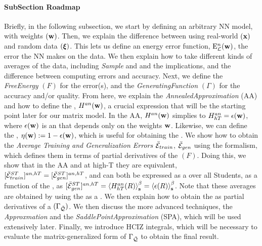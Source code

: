 \paragraph{SubSection Roadmap}
Briefly, in the following subsection,
we start by defining an arbitrary NN model, with weights $({\mathbf{w}})$.
Then, we explain the difference between using real-world $({\mathbf{x}})$ and random data $(\boldsymbol{\xi})$.
This lets us define an energy error function, ${\mathrm{E}}^{n}_{\mathcal{L}}(\mathbf{w})$,
the error the NN makes on the data.
We then explain how to take different kinds of \emph{\Thermodynamic} averages of the data,
including \emph{Sample} and \emph{\ThermalAverages} and the implications,
and the difference between computing errors and accuracy.
Next, we define the \emph{FreeEnergy} $(F)$ for the error(s), and the \emph{GeneratingFunction}  $(\Gamma)$
for the accuracy and/or quality.
From here, we explain the \emph{AnnealedApproximation} (AA) and
how to define the  \emph{\AnnealedHamiltonian}, $H^{an}({\mathbf{w}})$, a crucial expression
that will be the starting point later for our matrix model.
In the AA, $H^{an}({\mathbf{w}})$ simplies to  $H^{an}_{hT}=\epsilon({\mathbf{w}})$, where $\epsilon({\mathbf{w}})$ is an \EffectivePotential
that depends only on the weights ${\mathbf{w}}$.
Likewise, we can define the \SelfOverlap, $\eta({\mathbf{w}}):=1-\epsilon({\mathbf{w}})$, which is useful for
obtaining the \Quality.
We show how to obtain the \emph{Average Training and Generalization Errors} $\bar{\mathcal{E}}_{train}$, $\bar{\mathcal{E}}_{gen}$
using the \STATMECH formalism, which defines them in terms of partial derivatives of the \FreeEnergy $(F)$.
Doing this, we show that in the AA and at high-T they are equivalent,
$[\bar{\mathcal{E}}^{ST}_{train}]^{an,hT}=[\bar{\mathcal{E}}^{ST}_{gen}]^{an,hT}$,
and can both be expressed as a \ThermalAverage over all Students, as a function 
of the \Teacher, as $[\bar{\mathcal{E}}^{ST}_{gen}]^{an,hT}=\left\langle H^{an}_{hT}(R) \right\rangle_{\mathbf s}^{\beta}=\left\langle \epsilon(R) \right\rangle_{\mathbf s}^{\beta}$.
Note that these averages are obtained by using the \FreeEnergy as a \GeneratingFunction.
We then explain how to obtain the \ModelQuality as partial derivatives of a
\emph{\GeneratingFunction} $(\Gamma_{\bar{\mathcal{Q}}})$.
We then discuss the more advanced techniques, the
\emph{\LargeN Approxmation} and the \emph{SaddlePointApproximation} (SPA),
which will be used extensively later.
Finally, we introduce  HCIZ integrals, which will be necessary to evaluate the matrix-generalized
form of $\Gamma_{\bar{\mathcal{Q}}}$ to obtain the final result.


